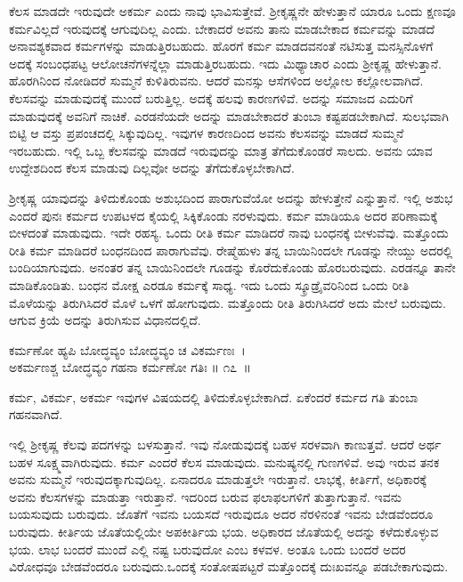 ಕೆಲಸ ಮಾಡದೇ ಇರುವುದೇ ಅಕರ್ಮ ಎಂದು ನಾವು ಭಾವಿಸುತ್ತೇವೆ. ಶ‍್ರೀಕೃಷ್ಣನೇ ಹೇಳುತ್ತಾನೆ ಯಾರೂ ಒಂದು ಕ್ಷಣವೂ ಕರ್ಮವಿಲ್ಲದೆ ಇರುವುದಕ್ಕೆ ಆಗುವುದಿಲ್ಲ ಎಂದು. ಬೇಕಾದರೆ ಅವನು ತಾನು ಮಾಡಬೇಕಾದ ಕರ್ಮವನ್ನು ಮಾಡದೆ ಅನಾವಶ್ಯಕವಾದ ಕರ್ಮಗಳನ್ನು ಮಾಡುತ್ತಿರಬಹುದು. ಹೊರಗೆ ಕರ್ಮ ಮಾಡದವನಂತೆ ನಟಿಸುತ್ತ ಮನಸ್ಸಿನೊಳಗೆ ಅದಕ್ಕೆ ಸಂಬಂಧಪಟ್ಟ ಆಲೋಚನೆಗಳನ್ನೆಲ್ಲಾ ಮಾಡುತ್ತಿರಬಹುದು. ಇದು ಮಿಥ್ಯಾಚಾರ ಎಂದು ಶ‍್ರೀಕೃಷ್ಣ ಹೇಳುತ್ತಾನೆ. ಹೊರಗಿನಿಂದ ನೋಡಿದರೆ ಸುಮ್ಮನೆ ಕುಳಿತಿರುವನು. ಆದರೆ ಮನಸ್ಸು ಆಸೆಗಳಿಂದ ಅಲ್ಲೋಲ ಕಲ್ಲೋಲವಾಗಿದೆ. ಕೆಲಸವನ್ನು ಮಾಡುವುದಕ್ಕೆ ಮುಂದೆ ಬರುತ್ತಿಲ್ಲ. ಅದಕ್ಕೆ ಹಲವು ಕಾರಣಗಳಿವೆ. ಅದನ್ನು ಸಮಾಜದ ಎದುರಿಗೆ ಮಾಡುವುದಕ್ಕೆ ಅವನಿಗೆ ನಾಚಿಕೆ. ಎರಡನೆಯದೇ ಅದನ್ನು ಮಾಡಬೇಕಾದರೆ ತುಂಬಾ ಕಷ್ಟಪಡಬೇಕಾಗಿದೆ. ಸುಲಭವಾಗಿ ಬಿಟ್ಟಿ ಆ ವಸ್ತು ಪ್ರಪಂಚದಲ್ಲಿ ಸಿಕ್ಕುವುದಿಲ್ಲ. ಇವುಗಳ ಕಾರಣದಿಂದ ಅವನು ಕೆಲಸವನ್ನು ಮಾಡದೆ ಸುಮ್ಮನೆ ಇರಬಹುದು. ಇಲ್ಲಿ ಒಬ್ಬ ಕೆಲಸವನ್ನು ಮಾಡದೆ ಇರುವುದನ್ನು ಮಾತ್ರ ತೆಗೆದುಕೊಂಡರೆ ಸಾಲದು. ಅವನು ಯಾವ ಉದ್ದೇಶದಿಂದ ಕೆಲಸ ಮಾಡುವು ದಿಲ್ಲವೋ ಅದನ್ನು ತೆಗೆದುಕೊಳ್ಳಬೇಕಾಗಿದೆ.

ಶ‍್ರೀಕೃಷ್ಣ ಯಾವುದನ್ನು ತಿಳಿದುಕೊಂಡು ಅಶುಭದಿಂದ ಪಾರಾಗುವೆಯೋ ಅದನ್ನು ಹೇಳುತ್ತೇನೆ ಎನ್ನುತ್ತಾನೆ. ಇಲ್ಲಿ ಅಶುಭ ಎಂದರೆ ಪುನಃ ಕರ್ಮದ ಉಪಟಳದ ಕೈಯಲ್ಲಿ ಸಿಕ್ಕಿಕೊಂಡು ನರಳುವುದು. ಕರ್ಮ ಮಾಡಿಯೂ ಅದರ ಪರಿಣಾಮಕ್ಕೆ ಬೀಳದಂತೆ ಮಾಡುವುದು. ಇದೇ ರಹಸ್ಯ. ಒಂದು ರೀತಿ ಕರ್ಮ ಮಾಡಿದರೆ ನಾವು ಬಂಧನಕ್ಕೆ ಬೀಳುವೆವು. ಮತ್ತೊಂದು ರೀತಿ ಕರ್ಮ ಮಾಡಿದರೆ ಬಂಧನದಿಂದ ಪಾರಾಗುವೆವು. ರೇಷ್ಮೆಹುಳು ತನ್ನ ಬಾಯಿನಿಂದಲೇ ಗೂಡನ್ನು ನೇಯ್ದು ಅದರಲ್ಲಿ ಬಂದಿಯಾಗುವುದು. ಅನಂತರ ತನ್ನ ಬಾಯಿನಿಂದಲೇ ಗೂಡನ್ನು ಕೊರೆದುಕೊಂಡು ಹೊರಬರುವುದು. ಎರಡನ್ನೂ ತಾನೇ ಮಾಡಿಕೊಂಡಿತು. ಬಂಧನ ಮೋಕ್ಷ ಎರಡೂ ಕರ್ಮಕ್ಕೆ ಸಾಧ್ಯ. ಇದು ಒಂದು ಸ್ಕ್ರೂಡ್ರೈವರಿನಿಂದ ಒಂದು ರೀತಿ ಮೊಳೆಯನ್ನು ತಿರುಗಿಸಿದರೆ ಮೊಳೆ ಒಳಗೆ ಹೋಗುವುದು. ಮತ್ತೊಂದು ರೀತಿ ತಿರುಗಿಸಿದರೆ ಅದು ಮೇಲೆ ಬರುವುದು. ಆಗುವ ಕ್ರಿಯೆ ಅದನ್ನು ತಿರುಗಿಸುವ ವಿಧಾನದಲ್ಲಿದೆ.

\begin{shloka}
ಕರ್ಮಣೋ ಹ್ಯಪಿ ಬೋದ್ಧವ್ಯಂ ಬೋದ್ಧವ್ಯಂ ಚ ವಿಕರ್ಮಣಃ~।\\ಅಕರ್ಮಣಶ್ಚ ಬೋದ್ಧವ್ಯಂ ಗಹನಾ ಕರ್ಮಣೋ ಗತಿಃ \hfill॥ ೧೭~॥
\end{shloka}

\begin{artha}
ಕರ್ಮ, ವಿಕರ್ಮ, ಅಕರ್ಮ ಇವುಗಳ ವಿಷಯದಲ್ಲಿ ತಿಳಿದುಕೊಳ್ಳಬೇಕಾಗಿದೆ. ಏಕೆಂದರೆ ಕರ್ಮದ ಗತಿ ತುಂಬಾ ಗಹನವಾಗಿದೆ.
\end{artha}

ಇಲ್ಲಿ ಶ‍್ರೀಕೃಷ್ಣ ಕೆಲವು ಪದಗಳನ್ನು ಬಳಸುತ್ತಾನೆ. ಇವು ನೋಡುವುದಕ್ಕೆ ಬಹಳ ಸರಳವಾಗಿ ಕಾಣುತ್ತವೆ. ಆದರೆ ಅರ್ಥ ಬಹಳ ಸೂಕ್ಷ್ಮವಾಗಿರುವುದು. ಕರ್ಮ ಎಂದರೆ ಕೆಲಸ ಮಾಡುವುದು. ಮನುಷ್ಯನಲ್ಲಿ ಗುಣಗಳಿವೆ. ಅವು ಇರುವ ತನಕ ಅವನು ಸುಮ್ಮನೆ ಇರುವುದಕ್ಕಾಗುವುದಿಲ್ಲ. ಏನಾದರೂ ಮಾಡುತ್ತಲೇ ಇರುತ್ತಾನೆ. ಲಾಭಕ್ಕೆ, ಕೀರ್ತಿಗೆ, ಅಧಿಕಾರಕ್ಕೆ ಅವನು ಕೆಲಸಗಳನ್ನು ಮಾಡುತ್ತಾ ಇರುತ್ತಾನೆ. ಇದರಿಂದ ಬರುವ ಫಲಾಫಲಗಳಿಗೆ ತುತ್ತಾಗುತ್ತಾನೆ. ಇವನು ಬಯಸುವುದು ಬರುವುದು. ಜೊತೆಗೆ ಇವನು ಬಯಸದೆ ಇರುವುದೂ ಅದರ ನೆರಳಿನಂತೆ ಇವನು ಬೇಡವೆಂದರೂ ಬರುವುದು. ಕೀರ್ತಿಯ ಜೊತೆಯಲ್ಲಿಯೇ ಅಪಕೀರ್ತಿಯ ಭಯ. ಅಧಿಕಾರದ ಜೊತೆಯಲ್ಲಿ ಅದನ್ನು ಕಳೆದುಕೊಳ್ಳುವ ಭಯ. ಲಾಭ ಬಂದರೆ ಮುಂದೆ ಎಲ್ಲಿ ನಷ್ಟ ಬರುವುದೋ ಎಂಬ ಕಳವಳ. ಅಂತೂ ಒಂದು ಬಂದರೆ ಅದರ ವಿರೋಧವೂ ಬೇಡವೆಂದರೂ ಬರುವುದು.\break ಒಂದಕ್ಕೆ ಸಂತೋಷಪಟ್ಟರೆ ಮತ್ತೊಂದಕ್ಕೆ ದುಃಖವನ್ನೂ ಪಡಬೇಕಾಗುವುದು.

